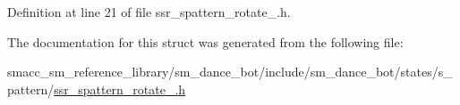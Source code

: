 Definition at line 21 of file ssr\+\_\+spattern\+\_\+rotate\+\_.\+h.




The documentation for this struct was generated from the following file\+:\begin{DoxyCompactItemize}
\item 
smacc\+\_\+sm\+\_\+reference\+\_\+library/sm\+\_\+dance\+\_\+bot/include/sm\+\_\+dance\+\_\+bot/states/s\+\_\+pattern/\hyperlink{ssr__spattern__rotate__2_8h}{ssr\+\_\+spattern\+\_\+rotate\+\_.\+h}\end{DoxyCompactItemize}
